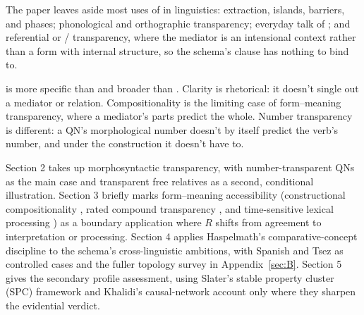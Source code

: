 The paper leaves aside most uses of  in linguistics: extraction, islands, barriers, and phases; phonological and orthographic transparency; everyday talk of ; and referential or / transparency, where the mediator is an intensional context rather than a form with internal structure, so the schema's  clause has nothing to bind to.

 is more specific than  and broader than . Clarity is rhetorical: it doesn't single out a mediator or relation. Compositionality is the limiting case of form--meaning transparency, where a mediator's parts predict the whole. Number transparency is different: a QN's morphological number doesn't by itself predict the verb's number, and under the construction it doesn't have to.

Section 2 takes up morphosyntactic transparency, with number-transparent QNs as the main case and transparent free relatives as a second, conditional illustration. Section 3 briefly marks form--meaning accessibility (constructional compositionality \autocite{goldberg-2006-constructions-at-work}, rated compound transparency \autocite{bell-schafer-2016-modelling-transparency}, and time-sensitive lexical processing \autocite{heyer-kornishova-2018-priming-eventually}) as a boundary application where $R$ shifts from agreement to interpretation or processing. Section 4 applies Haspelmath's \autocite*{haspelmath-2010-comparative-concepts} comparative-concept discipline to the schema's cross-linguistic ambitions, with Spanish and Tsez as controlled cases and the fuller topology survey in Appendix~\ref{sec:B}. Section 5 gives the secondary profile assessment, using Slater's stable property cluster (SPC) framework \autocite{slater-2015-natural-kindness} and Khalidi's causal-network account \autocite{khalidi-2018-causal-networks} only where they sharpen the evidential verdict.
